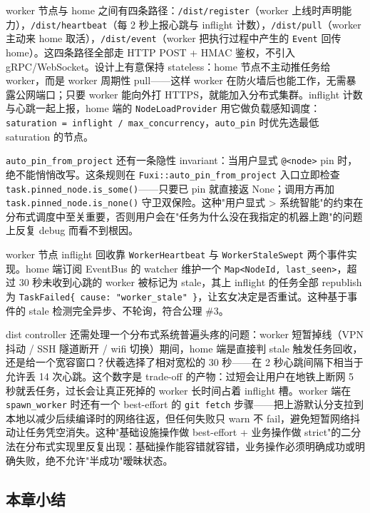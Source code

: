 worker 节点与 home 之间有四条路径：\texttt{/dist/register}（worker 上线时声明能力），\texttt{/dist/heartbeat}（每 2 秒上报心跳与 inflight 计数），\texttt{/dist/pull}（worker 主动来 home 取活），\texttt{/dist/event}（worker 把执行过程中产生的 \texttt{Event} 回传 home）。这四条路径全部走 HTTP POST + HMAC 鉴权，不引入 gRPC/WebSocket。设计上有意保持 stateless：home 节点不主动推任务给 worker，而是 worker 周期性 pull——这样 worker 在防火墙后也能工作，无需暴露公网端口；只要 worker 能向外打 HTTPS，就能加入分布式集群。inflight 计数与心跳一起上报，home 端的 \texttt{NodeLoadProvider} 用它做负载感知调度：\texttt{saturation = inflight / max\_concurrency}，\texttt{auto\_pin} 时优先选最低 saturation 的节点。

\texttt{auto\_pin\_from\_project} 还有一条隐性 invariant：当用户显式 \texttt{@<node>} pin 时，绝不能悄悄改写。这条规则在 \texttt{Fuxi::auto\_pin\_from\_project} 入口立即检查 \texttt{task.pinned\_node.is\_some()}——只要已 pin 就直接返 None；调用方再加 \texttt{task.pinned\_node.is\_none()} 守卫双保险。这种"用户显式 > 系统智能"的约束在分布式调度中至关重要，否则用户会在"任务为什么没在我指定的机器上跑"的问题上反复 debug 而看不到根因。

worker 节点 inflight 回收靠 \texttt{WorkerHeartbeat} 与 \texttt{WorkerStaleSwept} 两个事件实现。home 端订阅 EventBus 的 watcher 维护一个 \texttt{Map<NodeId, last\_seen>}，超过 30 秒未收到心跳的 worker 被标记为 stale，其上 inflight 的任务全部 republish 为 \texttt{TaskFailed\{ cause: "worker\_stale" \}}，让玄女决定是否重试。这种基于事件的 stale 检测完全异步、不轮询，符合公理 \#3。

dist controller 还需处理一个分布式系统普遍头疼的问题：worker 短暂掉线（VPN 抖动 / SSH 隧道断开 / wifi 切换）期间，home 端是直接判 stale 触发任务回收，还是给一个宽容窗口？伏羲选择了相对宽松的 30 秒——在 2 秒心跳间隔下相当于允许丢 14 次心跳。这个数字是 trade-off 的产物：过短会让用户在地铁上断网 5 秒就丢任务，过长会让真正死掉的 worker 长时间占着 inflight 槽。worker 端在 \texttt{spawn\_worker} 时还有一个 best-effort 的 \texttt{git fetch} 步骤——把上游默认分支拉到本地以减少后续编译时的网络往返，但任何失败只 warn 不 fail，避免短暂网络抖动让任务凭空消失。这种"基础设施操作做 best-effort + 业务操作做 strict"的二分法在分布式实现里反复出现：基础操作能容错就容错，业务操作必须明确成功或明确失败，绝不允许"半成功"暧昧状态。

\subsection{本章小结}

